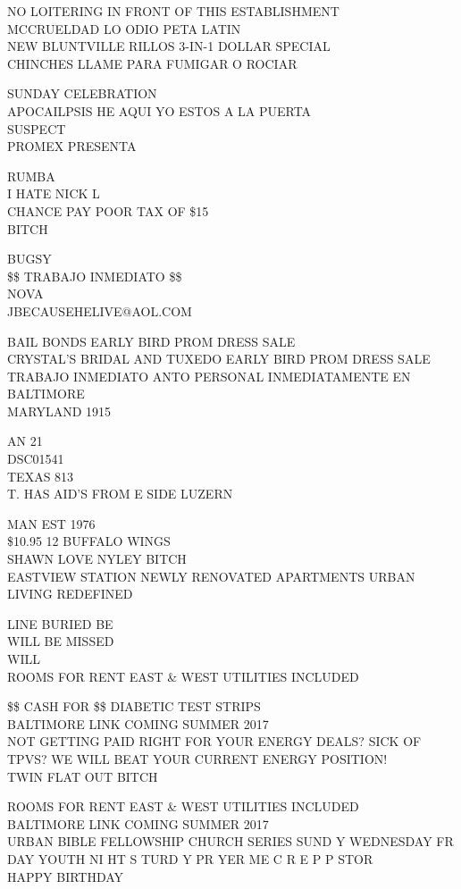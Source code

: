 \documentclass[10pt,letterpaper]{article}
\begin{document}
NO LOITERING IN FRONT OF THIS ESTABLISHMENT\\
MCCRUELDAD LO ODIO PETA LATIN\\
NEW BLUNTVILLE RILLOS 3{-}IN{-}1 DOLLAR SPECIAL\\
CHINCHES LLAME PARA FUMIGAR O ROCIAR

SUNDAY CELEBRATION\\
APOCAILPSIS HE AQUI YO ESTOS A LA PUERTA\\
SUSPECT\\
PROMEX PRESENTA

RUMBA\\
I HATE NICK L\\
CHANCE PAY POOR TAX OF \$15\\
BITCH

BUGSY\\
\$\$ TRABAJO INMEDIATO \$\$\\
NOVA\\
JBECAUSEHELIVE@AOL.COM

BAIL BONDS EARLY BIRD PROM DRESS SALE\\
CRYSTAL'S BRIDAL AND TUXEDO EARLY BIRD PROM DRESS SALE\\
TRABAJO INMEDIATO ANTO PERSONAL INMEDIATAMENTE EN BALTIMORE\\
MARYLAND 1915

AN 21\\
DSC01541\\
TEXAS 813\\
T. HAS AID'S FROM E SIDE LUZERN

MAN EST 1976\\
\$10.95 12 BUFFALO WINGS\\
SHAWN LOVE NYLEY BITCH\\
EASTVIEW STATION NEWLY RENOVATED APARTMENTS URBAN LIVING REDEFINED

LINE BURIED BE\\
WILL BE MISSED\\
WILL\\
ROOMS FOR RENT EAST \& WEST UTILITIES INCLUDED

\$\$ CASH FOR \$\$ DIABETIC TEST STRIPS\\
BALTIMORE LINK COMING SUMMER 2017\\
NOT GETTING PAID RIGHT FOR YOUR ENERGY DEALS?  SICK OF TPVS?  WE WILL BEAT YOUR CURRENT ENERGY POSITION!\\
TWIN FLAT OUT BITCH

ROOMS FOR RENT EAST \& WEST UTILITIES INCLUDED\\
BALTIMORE LINK COMING SUMMER 2017\\
URBAN BIBLE FELLOWSHIP CHURCH SERIES SUND Y WEDNESDAY FR DAY YOUTH NI HT S TURD Y PR YER ME C R E P P STOR\\
HAPPY BIRTHDAY
\end{document}
